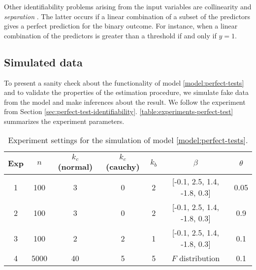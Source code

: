 Other identifiability problems arising from the input variables are
collinearity and {\em separation} \cite[p. 1360-1361]{gelman2008weakly}.
The latter occurs if a linear combination of a subset of the predictors gives
a perfect prediction for the binary outcome. For instance, when a linear
combination of the predictors is greater than a threshold if and only if $y =
  1$.

\subsection{Simulated data}

To present a sanity check about the functionality of model
\eqref{model:perfect-tests} and to validate the properties of the estimation
procedure, we simulate fake data from the model and make inferences about the
result. We follow the experiment from Section
\ref{sec:perfect-test-identifiability}.
\autoref{table:experiments-perfect-test} summarizes the experiment
parameters.

\begin{table}[!ht]
  \centering
  \caption{\label{table:experiments-perfect-test}Experiment settings for the
    simulation of model \eqref{model:perfect-tests}.}
  \begin{tabular}{ccccccc}
    \hline
    Exp                   & $n$  & $k_{c}$ (normal) & $k_{c}$ (cauchy) & $k_{b}$ & $\beta$                         & $\theta$ \\ \hline
    \multicolumn{1}{c}{1} & 100  & 3                & 0                & 2       & {[}-0.1, 2.5, 1.4, -1.8, 0.3{]} & 0.05     \\
    \multicolumn{1}{c}{2} & 100  & 3                & 0                & 2       & {[}-0.1, 2.5, 1.4, -1.8, 0.3{]} & 0.9      \\
    \multicolumn{1}{c}{3} & 100  & 2                & 2                & 1       & {[}-0.1, 2.5, 1.4, -1.8, 0.3{]} & 0.1      \\
    \multicolumn{1}{c}{4} & 5000 & 40               & 5                & 5       & $F$ distribution                & 0.1      \\\hline
  \end{tabular}
\end{table}

